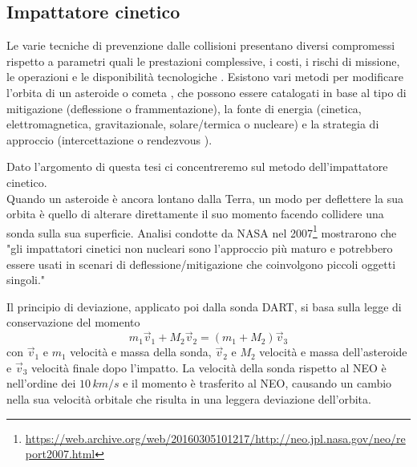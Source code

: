 \documentclass[a4paper,11pt,openright]{book}
\begin{document}
\subsection{Impattatore cinetico}
Le varie tecniche di prevenzione dalle collisioni presentano diversi compromessi rispetto a parametri quali le prestazioni complessive, i costi, i rischi di missione, le operazioni e le disponibilità tecnologiche \citep{canavan_interception_1992}. Esistono vari metodi per modificare l'orbita di un asteroide o cometa \citep{hall_ross_1997}, che possono essere catalogati in base al tipo di mitigazione (deflessione o frammentazione), la fonte di energia (cinetica, elettromagnetica, gravitazionale, solare/termica o nucleare) e la strategia di approccio (intercettazione o rendezvous \citep{solem_interception_1993}).

Dato l'argomento di questa tesi ci concentreremo sul metodo dell'impattatore cinetico.\\
Quando un asteroide è ancora lontano dalla Terra, un modo per deflettere la sua orbita è quello di alterare direttamente il suo momento facendo collidere una sonda sulla sua superficie. Analisi condotte da NASA nel 2007\footnote{\href{https://web.archive.org/web/20160305101217/http://neo.jpl.nasa.gov/neo/report2007.html}{https://web.archive.org/web/20160305101217/http://neo.jpl.nasa.gov/neo/report2007.html}} mostrarono che "gli impattatori cinetici non nucleari sono l'approccio più maturo e potrebbero essere usati in scenari di deflessione/mitigazione che coinvolgono piccoli oggetti singoli."

Il principio di deviazione, applicato poi dalla sonda DART, si basa sulla legge di conservazione del momento
\begin{equation}
    m_1 \vec{v}_1 + M_2\vec{v}_2 = (m_1+M_2)\vec{v}_3
\end{equation}
con $\vec{v}_1$ e $m_1$ velocità e massa della sonda, $\vec{v}_2$ e $M_2$ velocità e massa dell'asteroide e $\vec{v}_3$ velocità finale dopo l'impatto. 
La velocità della sonda rispetto al NEO è nell'ordine dei $10\,km/s$ e il momento è trasferito al NEO, causando un cambio nella sua velocità orbitale che risulta in una leggera deviazione dell'orbita.
\end{document}
